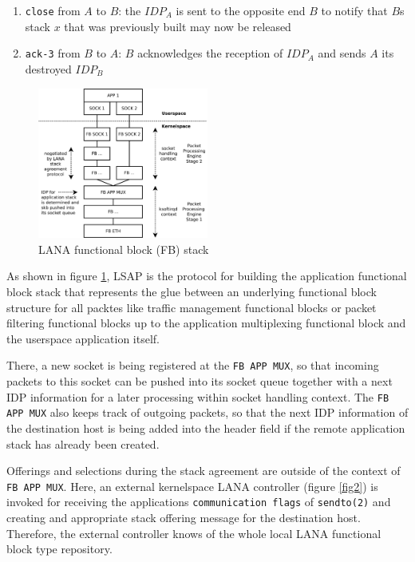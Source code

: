 \documentclass[times,10pt,twocolumn]{article}
\begin{document}
\begin{enumerate}
        \setlength{\itemsep}{-1mm}
	\item \texttt{close} from $A$ to $B$: the $IDP_A$ is
              sent to the opposite end $B$ to notify that $B$s stack $x$
              that was previously built may now be released
	\item \texttt{ack-3} from $B$ to $A$: $B$ acknowledges the 
              reception of $IDP_A$ and sends $A$ its destroyed $IDP_B$
\end{enumerate}

\begin{figure}[ht]
  \centering
  \includegraphics[width=0.5\textwidth]{stack.pdf}
  \caption{LANA functional block (FB) stack}
  \label{fig1}
\end{figure}

As shown in figure \ref{fig1}, LSAP is the protocol for building the 
application functional block stack that represents the glue between 
an underlying functional block structure for all packtes like traffic 
management functional blocks or packet filtering functional blocks 
up to the application multiplexing functional block and the userspace
application itself.\newline

There, a new socket is being registered at the \texttt{FB APP MUX}, so 
that incoming packets to this socket can be pushed into its socket queue
together with a next IDP information for a later processing within socket 
handling context. The \texttt{FB APP MUX} also keeps track of outgoing
packets, so that the next IDP information of the destination host is 
being added into the header field if the remote application stack has 
already been created.\newline

Offerings and selections during the stack agreement are outside of the 
context of \texttt{FB APP MUX}. Here, an external kernelspace LANA
controller (figure \ref{fig2}) is invoked for receiving the applications 
\texttt{communication flags} of \texttt{sendto(2)} and creating and 
appropriate stack offering message for the destination host. Therefore, 
the external controller knows of the whole local LANA functional block 
type repository.
\end{document}
